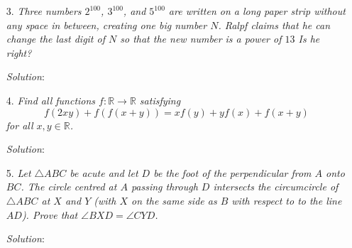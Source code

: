 \documentclass{article}
\begin{document}
\begin{enumerate}[1.]
\item[3.] %
\textit{Three numbers $2^{100}$, $3^{100}$, and $5^{100}$ are written on a long paper strip without any space in between, creating one big number $N$.
Ralpf claims that he can change the last digit of $N$ so that the new number is a power of $13$
Is he right?}

\textit{Solution}:


\item[4.] %
\textit{Find all functions $f: \mathbb{R} \to \mathbb{R}$ satisfying
\[ f(2xy) +f(f(x+y)) = xf(y) + yf(x) +f(x+y) \]
for all $x,y \in \mathbb{R}$.}

\textit{Solution}:


\item[5.] %
\textit{Let $\triangle ABC$ be acute and let $D$ be the foot of the perpendicular from $A$ onto $BC$.
The circle centred at $A$ passing through $D$ intersects the circumcircle of $\triangle ABC$ at $X$ and $Y$ (with $X$ on the same side as $B$ with respect to to the line $AD$).
Prove that $\angle BXD = \angle CYD$.}

\textit{Solution}: 


\end{enumerate}
\end{document}

